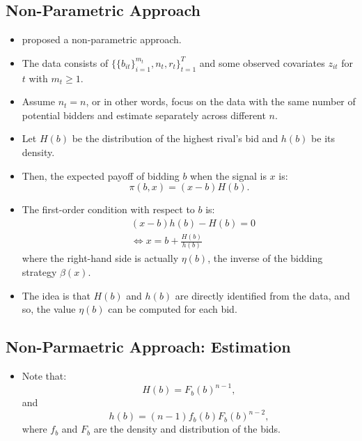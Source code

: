 \documentclass[
]{book}
\providecommand{\tightlist}{%
  \setlength{\itemsep}{0pt}\setlength{\parskip}{0pt}}
\begin{document}
\hypertarget{non-parametric-approach}{%
\subsection{Non-Parametric Approach}\label{non-parametric-approach}}

\begin{itemize}
\tightlist
\item
  \citet{guerreOptimalNonparametricEstimation2000} proposed a non-parametric approach.
\item
  The data consists of \(\{\{b_{it}\}_{i = 1}^{m_t}, n_t, r_t\}_{t = 1}^T\) and some observed covariates \(z_{it}\) for \(t\) with \(m_t \ge 1\).
\item
  Assume \(n_t = n\), or in other words, focus on the data with the same number of potential bidders and estimate separately across different \(n\).
\item
  Let \(H(b)\) be the distribution of the highest rival's bid and \(h(b)\) be its density.
\item
  Then, the expected payoff of bidding \(b\) when the signal is \(x\) is:
  \[
  \pi(b, x) = (x - b) H(b).
  \]
\item
  The first-order condition with respect to \(b\) is:
  \[
  \begin{split}
  & (x - b) h(b) - H(b) = 0\\
  &\Leftrightarrow x = b + \frac{H(b)}{h(b)}
  \end{split}
  \]
  where the right-hand side is actually \(\eta(b)\), the inverse of the bidding strategy \(\beta(x)\).
\item
  The idea is that \(H(b)\) and \(h(b)\) are directly identified from the data, and so, the value \(\eta(b)\) can be computed for each bid.
\end{itemize}

\hypertarget{non-parmaetric-approach-estimation}{%
\subsection{Non-Parmaetric Approach: Estimation}\label{non-parmaetric-approach-estimation}}

\begin{itemize}
\tightlist
\item
  Note that:
  \[
  H(b) = F_b(b)^{n - 1},
  \]
  and
  \[
  h(b) = (n - 1) f_b(b) F_b(b)^{n - 2},
  \]
  where \(f_b\) and \(F_b\) are the density and distribution of the bids.
\end{itemize}
\end{document}
